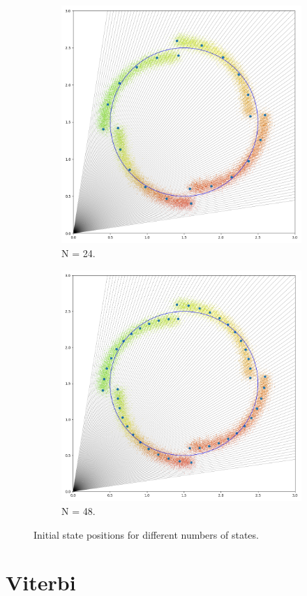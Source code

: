 \documentclass[twoside]{article}
\begin{document}
\begin{figure}[h]
  \centering
  \begin{subfigure}[h]{0.48\textwidth}
    \includegraphics[width=\textwidth]{images/init-states-24}
    \caption{N = 24.}\label{fig:24-states}
  \end{subfigure}
  \begin{subfigure}[h]{0.48\textwidth}
    \includegraphics[width=\textwidth]{images/init-states-48}
    \caption{N = 48.}\label{fig:48-states}
  \end{subfigure}
  \caption{Initial state positions for different numbers of states.}\label{fig:init-trans-pos}
\end{figure}

\section{Viterbi}\label{sec:viterbi}
\end{document}
